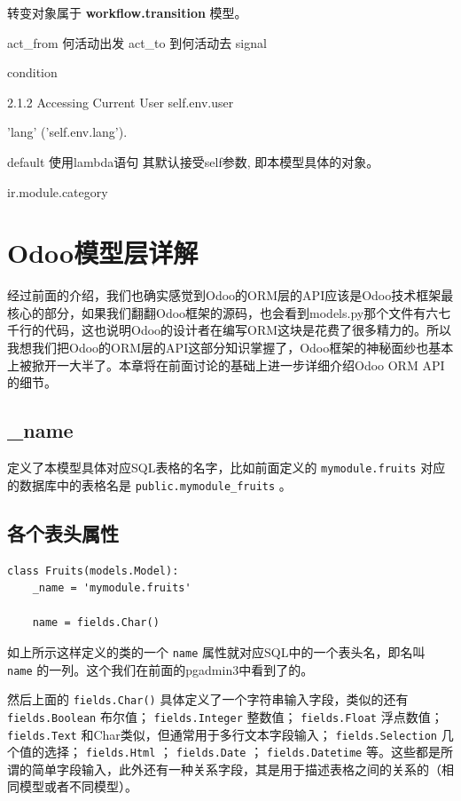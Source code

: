 \documentclass[11pt,a4paper]{sphinxmanual}
\begin{document}
转变对象属于 \textbf{workflow.transition} 模型。

act\_from 何活动出发
act\_to 到何活动去
signal 

condition



2.1.2 Accessing Current User
self.env.user

'lang' ('self.env.lang').


default 使用lambda语句  其默认接受self参数, 即本模型具体的对象。

ir.module.category   




\chapter{Odoo模型层详解}
\label{sec-11}
经过前面的介绍，我们也确实感觉到Odoo的ORM层的API应该是Odoo技术框架最核心的部分，如果我们翻翻Odoo框架的源码，也会看到models.py那个文件有六七千行的代码，这也说明Odoo的设计者在编写ORM这块是花费了很多精力的。所以我想我们把Odoo的ORM层的API这部分知识掌握了，Odoo框架的神秘面纱也基本上被掀开一大半了。本章将在前面讨论的基础上进一步详细介绍Odoo ORM API的细节。

\section{\_name}
\label{sec-11-1}
定义了本模型具体对应SQL表格的名字，比如前面定义的 \verb~mymodule.fruits~ 对应的数据库中的表格名是 \verb~public.mymodule_fruits~ 。


\section{各个表头属性}
\label{sec-11-2}
\begin{Verbatim}
class Fruits(models.Model):
    _name = 'mymodule.fruits'

    name = fields.Char()
\end{Verbatim}

如上所示这样定义的类的一个 \verb~name~ 属性就对应SQL中的一个表头名，即名叫 \verb~name~ 的一列。这个我们在前面的pgadmin3中看到了的。

然后上面的 \verb~fields.Char()~ 具体定义了一个字符串输入字段，类似的还有 \verb~fields.Boolean~ 布尔值； \verb~fields.Integer~ 整数值； \verb~fields.Float~ 浮点数值； \verb~fields.Text~ 和Char类似，但通常用于多行文本字段输入； \verb~fields.Selection~ 几个值的选择； \verb~fields.Html~ ； \verb~fields.Date~ ； \verb~fields.Datetime~ 等。这些都是所谓的简单字段输入，此外还有一种关系字段，其是用于描述表格之间的关系的（相同模型或者不同模型）。
\end{document}
